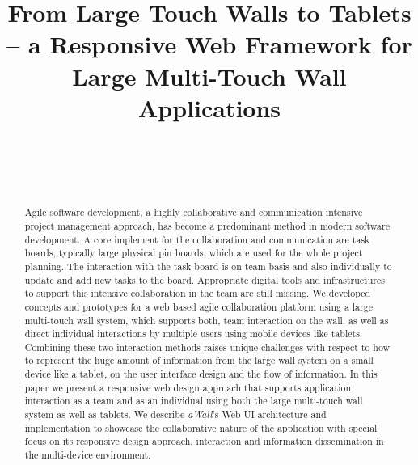 \documentclass{sigchi}
\begin{document}
\title{From Large Touch Walls to Tablets -- a Responsive Web Framework for Large Multi-Touch Wall Applications}

\author{%
  \\
  \\
  \\
}

\maketitle



\begin{abstract}
Agile software development, a highly collaborative and communication intensive project management approach, has become a predominant method in modern software development. A core implement for the collaboration and communication are task boards, typically large physical pin boards, which are used for the whole project planning.  The interaction with the task board is on team basis and also individually to update and add new tasks to the board. Appropriate digital tools and infrastructures to support this intensive collaboration in the team are still missing. 
We developed concepts and prototypes for a web based agile collaboration platform using a large multi-touch wall system, which supports both, team interaction on the wall, as well as direct individual interactions by multiple users using mobile devices like tablets. Combining these two interaction methods raises unique challenges with respect to how to represent the huge amount of information from the large wall system on a small device like a tablet, on the user interface design and the flow of information.
In this paper we present a responsive web design approach that supports application interaction as a team and as an individual using both the large multi-touch wall system as well as tablets.  We describe \textit{aWall}'s Web UI architecture and implementation to showcase the collaborative nature of the application with special focus on its responsive design approach, interaction and information dissemination in the multi-device environment.
\end{abstract}
\end{document}
